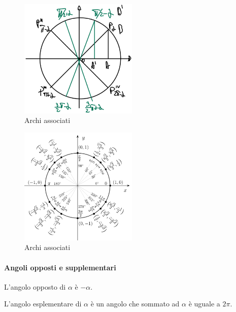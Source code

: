 \begin{figure}
    \centering
    \includegraphics[width=0.5\textwidth]{Analisi1/figures/archi_associati1.jpeg}
    \caption{Archi associati}
    \label{fig:archi_associati1}
\end{figure}

\begin{figure}
    \centering
    \includegraphics[width=0.5\textwidth]{Analisi1/figures/archi_associati.png}
    \caption{Archi associati}
    \label{fig:archi_associati}
\end{figure}

\paragraph{Angoli opposti e supplementari}
\begin{definition}
    L'angolo opposto di $\alpha$ è $-\alpha$.
\end{definition}

\begin{definition}
    L'angolo esplementare di $\alpha$ è un angolo che sommato ad $\alpha$ è uguale a $2\pi$.
\end{definition}

